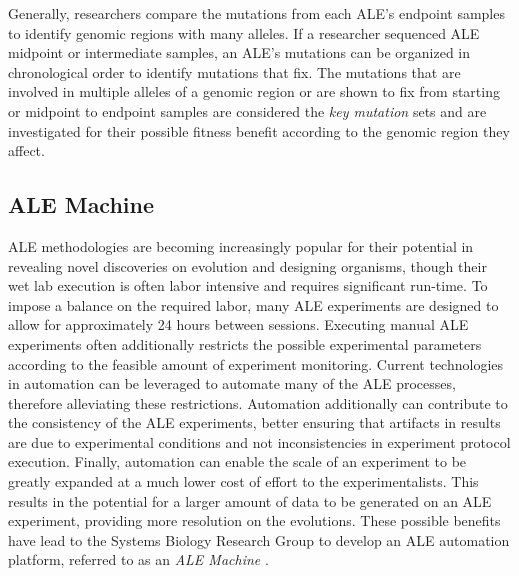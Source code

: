 \documentclass[12pt,final,masters,chapterheads]{ucsd}  %
\begin{document}
Generally, researchers compare the mutations from each ALE's endpoint samples to identify genomic regions with many alleles. If a researcher sequenced ALE midpoint or intermediate samples, an ALE's mutations can be organized in chronological order to identify mutations that fix. The mutations that are involved in multiple alleles of a genomic region or are shown to fix from starting or midpoint to endpoint samples are considered the \textit{key mutation} sets and are investigated for their possible fitness benefit according to the genomic region they affect.


\subsection{ALE Machine}

ALE methodologies are becoming increasingly popular for their potential in revealing novel discoveries on evolution and designing organisms, though their wet lab execution is often labor intensive and requires significant run-time. To impose a balance on the required labor, many ALE experiments are designed to allow for approximately 24 hours between sessions. Executing manual ALE experiments often additionally restricts the possible experimental parameters according to the feasible amount of experiment monitoring. Current technologies in automation can be leveraged to automate many of the ALE processes, therefore alleviating these restrictions. Automation additionally can contribute to the consistency of the ALE experiments, better ensuring that artifacts in results are due to experimental conditions and not inconsistencies in experiment protocol execution. Finally, automation can enable the scale of an experiment to be greatly expanded at a much lower cost of effort to the experimentalists. This results in the potential for a larger amount of data to be generated on an ALE experiment, providing more resolution on the evolutions. These possible benefits have lead to the Systems Biology Research Group to develop an ALE automation platform, referred to as an \textit{ALE Machine} \cite{ryan_thesis}.
\end{document}
